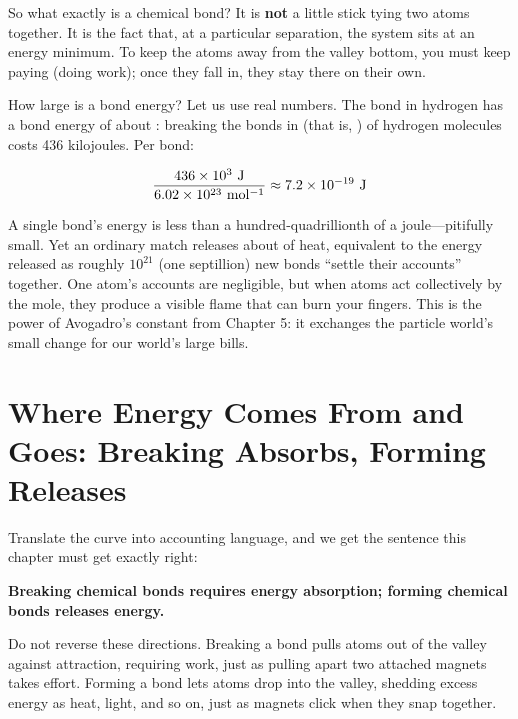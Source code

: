 So what exactly is a chemical bond? It is \textbf{not} a little stick tying two atoms together. It is the fact that, at a particular separation, the system sits at an energy minimum. To keep the atoms away from the valley bottom, you must keep paying (doing work); once they fall in, they stay there on their own.

\begin{qiaoliang}
How large is a bond energy? Let us use real numbers. The  bond in hydrogen has a bond energy of about : breaking the bonds in  (that is, ) of hydrogen molecules costs 436 kilojoules. Per bond:

\[ \frac{436\times 10^{3}\ \mathrm{J}}{\ud{6.02\times 10^{23}}{mol^{-1}}} \approx 7.2\times 10^{-19}\ \mathrm{J} \]

A single bond's energy is less than a hundred-quadrillionth of a joule---pitifully small. Yet an ordinary match releases about  of heat, equivalent to the energy released as roughly $10^{21}$ (one septillion) new bonds ``settle their accounts'' together. One atom's accounts are negligible, but when atoms act collectively by the mole, they produce a visible flame that can burn your fingers. This is the power of Avogadro's constant from Chapter 5: it exchanges the particle world's small change for our world's large bills.
\end{qiaoliang}

\section{Where Energy Comes From and Goes: Breaking Absorbs, Forming Releases}

Translate the curve into accounting language, and we get the sentence this chapter must get exactly right:

\textbf{Breaking chemical bonds requires energy absorption; forming chemical bonds releases energy.}

Do not reverse these directions. Breaking a bond pulls atoms out of the valley against attraction, requiring work, just as pulling apart two attached magnets takes effort. Forming a bond lets atoms drop into the valley, shedding excess energy as heat, light, and so on, just as magnets click when they snap together.

